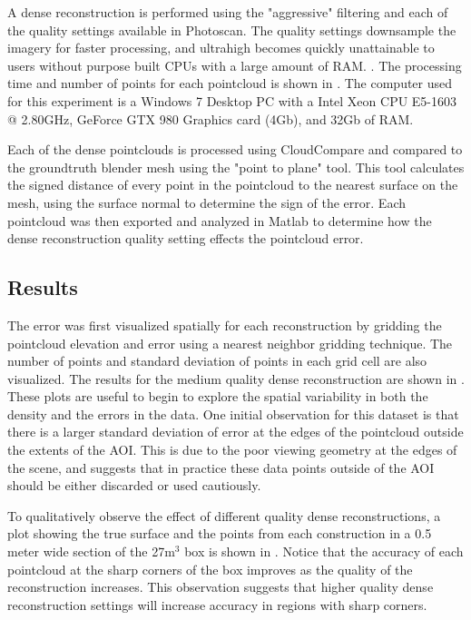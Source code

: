 A dense reconstruction is performed using the "aggressive" filtering and each of the quality settings available in Photoscan.  The quality settings downsample the imagery for faster processing, and ultrahigh becomes quickly unattainable to users without purpose built CPUs with a large amount of RAM. . The processing time and number of points for each pointcloud is shown in .  The computer used for this experiment is a Windows 7 Desktop PC with a Intel Xeon CPU E5-1603 @ 2.80GHz, GeForce GTX 980 Graphics card (4Gb), and 32Gb of RAM.



Each of the dense pointclouds is processed using CloudCompare  and compared to the groundtruth blender mesh using the "point to plane" tool.  This tool calculates the signed distance of every point in the pointcloud to the nearest surface on the mesh, using the surface normal to determine the sign of the error. Each pointcloud was then exported and analyzed in Matlab to determine how the dense reconstruction quality setting effects the pointcloud error.

\subsection{Results}

The error was first visualized spatially for each reconstruction by gridding the pointcloud elevation and error using a nearest neighbor gridding technique.  The number of points and standard deviation of points in each grid cell are also visualized.  The results for the medium quality dense reconstruction are shown in .  These plots are useful to begin to explore the spatial variability in both the density and the errors in the data.  One initial observation for this dataset is that there is a larger standard deviation of error at the edges of the pointcloud outside the extents of the AOI.  This is due to the poor viewing geometry at the edges of the scene, and suggests that in practice these data points outside of the AOI should be either discarded or used cautiously.



To qualitatively observe the effect of different quality dense reconstructions, a plot showing the true surface and the points from each construction in a 0.5 meter wide section of the 27m$^3$ box is shown in .  Notice that the accuracy of each pointcloud at the sharp corners of the box improves as the quality of the reconstruction increases.  This observation suggests that higher quality dense reconstruction settings will increase accuracy in regions with sharp corners.

